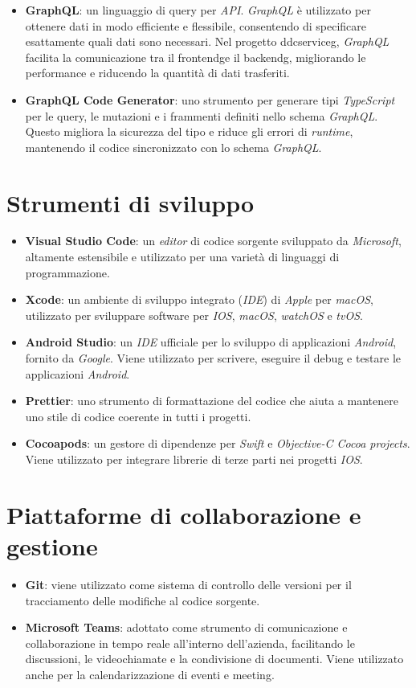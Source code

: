 \begin{itemize}
    \item \textbf{GraphQL}: un linguaggio di query per \textit{API}\glox.
    \textit{GraphQL} è utilizzato per ottenere dati in modo efficiente e flessibile, consentendo di specificare esattamente quali dati sono necessari.
    Nel progetto \gls{ddcserviceg}\glox, \textit{GraphQL} facilita la comunicazione tra il \gls{frontendg}\glox e il \gls{backendg}\glox, migliorando le performance e riducendo la quantità di dati trasferiti.
    \item \textbf{GraphQL Code Generator}: uno strumento per generare tipi \textit{TypeScript} per le query, le mutazioni e i frammenti definiti nello schema \textit{GraphQL}. Questo migliora la sicurezza del tipo e riduce gli errori di \textit{runtime}, mantenendo il codice sincronizzato con lo schema \textit{GraphQL}.
\end{itemize}


\section{Strumenti di sviluppo}
\begin{itemize}
\item \textbf{Visual Studio Code}: un \textit{editor} di codice sorgente sviluppato da \textit{Microsoft}, altamente estensibile e utilizzato per una varietà di linguaggi di programmazione.
\item \textbf{Xcode}: un ambiente di sviluppo integrato (\textit{IDE}) di \textit{Apple} per \textit{macOS}, utilizzato per sviluppare software per \textit{IOS}, \textit{macOS}, \textit{watchOS} e \textit{tvOS}.
\item \textbf{Android Studio}: un \textit{IDE} ufficiale per lo sviluppo di applicazioni \textit{Android}, fornito da \textit{Google}. Viene utilizzato per scrivere, eseguire il debug e testare le applicazioni \textit{Android}.
\item \textbf{Prettier}: uno strumento di formattazione del codice che aiuta a mantenere uno stile di codice coerente in tutti i progetti.
\item \textbf{Cocoapods}: un gestore di dipendenze per \textit{Swift} e \textit{Objective-C Cocoa projects}. Viene utilizzato per integrare librerie di terze parti nei progetti \textit{IOS}.
\end{itemize}

\section{Piattaforme di collaborazione e gestione}
\begin{itemize}
\item \textbf{Git}: viene utilizzato come sistema di controllo delle versioni per il tracciamento delle modifiche al codice sorgente.
\item \textbf{Microsoft Teams}: adottato come strumento di comunicazione e collaborazione in tempo reale all'interno dell'azienda, facilitando le discussioni, le videochiamate e la condivisione di documenti. Viene utilizzato anche per la calendarizzazione di eventi e meeting.
\end{itemize}

